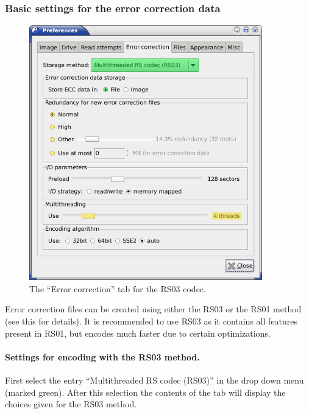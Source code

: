 \newpage
\subsubsection{Basic settings for the error correction data}
\label{howto-eccfile-basic-settings-ecc}

\begin{figure}[h]
\centerline{\includegraphics[width=0.9\textwidth]{screenshots/eccfile-prefs-ecc-file3.png}}
\caption{The ``Error correction'' tab for the RS03 codec.}  
\label{howto-eccfile-prefs-ecc-file3}
\end{figure}

Error correction files can be created using either the RS03 or the RS01 method
(see this  for details).
It is recommended to use RS03 as it contains all features present in RS01,
but encodes much faster due to certain optimizations.

\paragraph{Settings for encoding with the RS03 method.} First select the entry
``Multithreaded RS codec (RS03)'' in the drop down menu (marked green).
After this selection the contents of the tab will display the choices given
for the RS03 method. 

